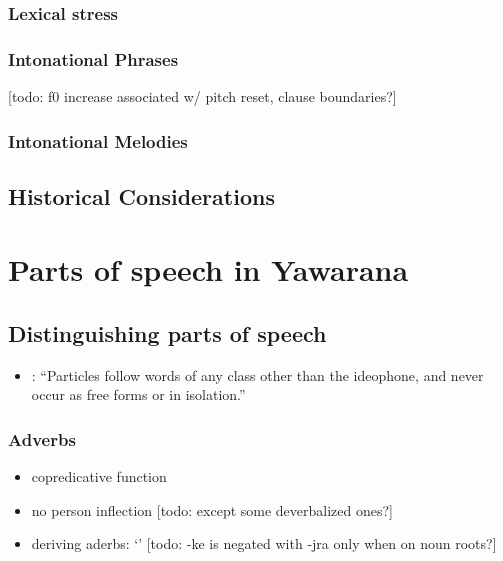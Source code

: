 \documentclass{memoir}
\begin{document}
\subsection{\texorpdfstring{Lexical stress
\label{sec:stress}}{Lexical stress }}

\subsection{\texorpdfstring{Intonational Phrases
\label{sec:intphrases}}{Intonational Phrases }}

{[}todo: f0 increase associated w/ pitch reset, clause boundaries?{]}

\subsection{\texorpdfstring{Intonational Melodies
\label{sec:intmelodies}}{Intonational Melodies }}

\section{\texorpdfstring{Historical Considerations
\label{sec:histphono}}{Historical Considerations }}

\chapter{\texorpdfstring{Parts of speech in Yawarana
\label{POS}}{Parts of speech in Yawarana }}

\section{Distinguishing parts of speech}

\begin{itemize}
\tightlist
\item
  \textcites[111]{koehn1986apalai}: ``Particles follow words of any
  class other than the ideophone, and never occur as free forms or in
  isolation.''
\end{itemize}

\subsection{Adverbs}

\begin{itemize}
\tightlist
\item
  copredicative function
\item
  no person inflection {[}todo: except some deverbalized ones?{]}
\item
  deriving aderbs:  `' {[}todo: -ke is negated with
  -jra only when on noun roots?{]}
\end{itemize}
\end{document}
